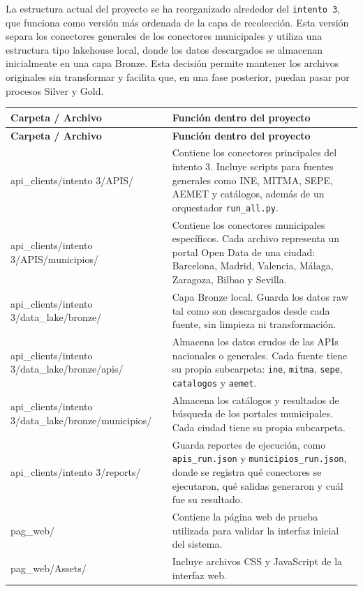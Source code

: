 La estructura actual del proyecto se ha reorganizado alrededor del \texttt{intento 3}, que funciona como versión más ordenada de la capa de recolección. Esta versión separa los conectores generales de los conectores municipales y utiliza una estructura tipo lakehouse local, donde los datos descargados se almacenan inicialmente en una capa Bronze. Esta decisión permite mantener los archivos originales sin transformar y facilita que, en una fase posterior, puedan pasar por procesos Silver y Gold.

\begin{longtable}{>{\raggedright\arraybackslash}p{} >{\raggedright\arraybackslash}p{}}
\toprule
\textbf{Carpeta / Archivo} & \textbf{Función dentro del proyecto} \\
\midrule
\endfirsthead
\toprule
\textbf{Carpeta / Archivo} & \textbf{Función dentro del proyecto} \\
\midrule
\endhead
api\_clients/intento 3/APIS/ & Contiene los conectores principales del intento 3. Incluye scripts para fuentes generales como INE, MITMA, SEPE, AEMET y catálogos, además de un orquestador \texttt{run\_all.py}. \\
api\_clients/intento 3/APIS/municipios/ & Contiene los conectores municipales específicos. Cada archivo representa un portal Open Data de una ciudad: Barcelona, Madrid, Valencia, Málaga, Zaragoza, Bilbao y Sevilla. \\
api\_clients/intento 3/data\_lake/bronze/ & Capa Bronze local. Guarda los datos raw tal como son descargados desde cada fuente, sin limpieza ni transformación. \\
api\_clients/intento 3/data\_lake/bronze/apis/ & Almacena los datos crudos de las APIs nacionales o generales. Cada fuente tiene su propia subcarpeta: \texttt{ine}, \texttt{mitma}, \texttt{sepe}, \texttt{catalogos} y \texttt{aemet}. \\
api\_clients/intento 3/data\_lake/bronze/municipios/ & Almacena los catálogos y resultados de búsqueda de los portales municipales. Cada ciudad tiene su propia subcarpeta. \\
api\_clients/intento 3/reports/ & Guarda reportes de ejecución, como \texttt{apis\_run.json} y \texttt{municipios\_run.json}, donde se registra qué conectores se ejecutaron, qué salidas generaron y cuál fue su resultado. \\
pag\_web/ & Contiene la página web de prueba utilizada para validar la interfaz inicial del sistema. \\
pag\_web/Assets/ & Incluye archivos CSS y JavaScript de la interfaz web. \\

\end{longtable}
